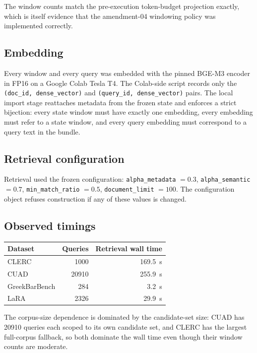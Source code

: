 \documentclass[11pt,a4paper]{article}
\begin{document}
The window counts match the pre-execution token-budget projection
exactly, which is itself evidence that the amendment-04 windowing
policy was implemented correctly.

\subsection{Embedding}
Every window and every query was embedded with the pinned BGE-M3
encoder in FP16 on a Google Colab Tesla T4. The Colab-side script
records only the \texttt{(doc\_id, dense\_vector)} and
\texttt{(query\_id, dense\_vector)} pairs. The local import stage
reattaches metadata from the frozen state and enforces a strict
bijection: every state window must have exactly one embedding, every
embedding must refer to a state window, and every query embedding
must correspond to a query text in the bundle.

\subsection{Retrieval configuration}
Retrieval used the frozen configuration: \texttt{alpha\_metadata}
$=0.3$, \texttt{alpha\_semantic} $=0.7$,
\texttt{min\_match\_ratio} $=0.5$, \texttt{document\_limit} $=100$.
The configuration object refuses construction if any of these values
is changed.

\subsection{Observed timings}
\begin{center}
\small
\begin{tabular}{l r r}
\toprule
\textbf{Dataset} & \textbf{Queries} & \textbf{Retrieval wall time} \\
\midrule
CLERC              & \num{1000}  & \SI{169.5}{\second} \\
CUAD               & \num{20910} & \SI{255.9}{\second} \\
GreekBarBench      & \num{284}   & \SI{3.2}{\second} \\
LaRA               & \num{2326}  & \SI{29.9}{\second} \\
\bottomrule
\end{tabular}
\end{center}

The corpus-size dependence is dominated by the candidate-set size:
CUAD has \num{20910} queries each scoped to its own candidate set,
and CLERC has the largest full-corpus fallback, so both dominate the
wall time even though their window counts are moderate.
\end{document}
